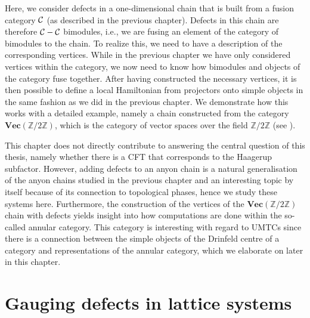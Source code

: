 Here, we consider defects in a one-dimensional chain that is built from a fusion category ${\mathcal{C}}$ (as described in the previous chapter). Defects in this chain are therefore ${\mathcal{C}}-{\mathcal{C}}$ bimodules, i.e., we are fusing an element of the category of bimodules to the chain. To realize this, we need to have a description of the corresponding vertices. While in the previous chapter we have only considered vertices within the category, we now need to know how bimodules and objects of the category fuse together. After having constructed the necessary vertices, it is then possible to define a local Hamiltonian from projectors onto simple objects in the same fashion as we did in the previous chapter. We demonstrate how this works with a detailed example, namely a chain constructed from the category $\mathbf{Vec}(\mathbb{Z}/2\mathbb{Z})$, which is the category of vector spaces over the field $\mathbb{Z}/2\mathbb{Z}$ (see \cite{Bridgeman2020}).

This chapter does not directly contribute to answering the central question of this thesis, namely whether there is a CFT that corresponds to the Haagerup subfactor. However, adding defects to an anyon chain is a natural generalisation of the anyon chains studied in the previous chapter and an interesting topic by itself because of its connection to topological phases, hence we study these systems here. Furthermore, the construction of the vertices of the $\mathbf{Vec}(\mathbb{Z}/2\mathbb{Z})$ chain with defects yields insight into how computations are done within the so-called annular category. This category is interesting with regard to UMTCs since there is a connection between the simple objects of the Drinfeld centre of a category and representations of the annular category, which we elaborate on later in this chapter. 


\section{Gauging defects in lattice systems}

